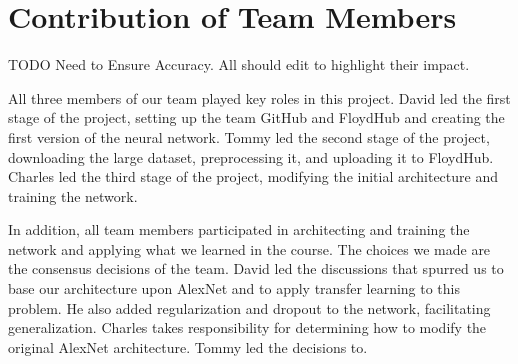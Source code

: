 \section{Contribution of Team Members}

TODO Need to Ensure Accuracy. All should edit to highlight their impact.

All three members of our team played key roles in this project. David led the first stage of the project, setting up the team GitHub and FloydHub and creating the first version of the neural network. Tommy led the second stage of the project, downloading the large dataset, preprocessing it, and uploading it to FloydHub. Charles led the third stage of the project, modifying the initial architecture and training the network.

In addition, all team members participated in architecting and training the network and applying what we learned in the course. The choices we made are the consensus decisions of the team. David led the discussions that spurred us to base our architecture upon AlexNet and to apply transfer learning to this problem. He also added regularization and dropout to the network, facilitating generalization. Charles takes responsibility for determining how to modify the original AlexNet architecture. Tommy led the decisions to.